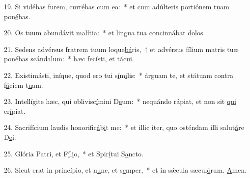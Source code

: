19. Si vidébas furem, curr\uline{é}bas cum \uline{e}o:~* et cum adúlteris portiónem t\uline{u}am pon\uline{é}bas.\par 
20. Os tuum abundávit mal\uline{í}t\uline{i}a:~* et lingua tua concinn\uline{á}bat d\uline{o}los.\par 
21. Sedens advérsus fratrem tuum loque\uline{bá}ris,~† et advérsus fílium matris tuæ ponébas sc\uline{á}nd\uline{a}lum:~* hæc fec\uline{í}sti, et t\uline{á}cui.\par 
22. Existimásti, iníque, quod ero tui s\uline{í}m\uline{i}lis:~* árguam te, et státuam contra f\uline{á}ciem t\uline{u}am.\par 
23. Intellígite hæc, qui oblivisc\uline{í}mini D\uline{e}um:~* nequándo rápiat, et non sit \uline{qui} er\uline{í}piat.\par 
24. Sacrifícium laudis honorific\uline{á}b\uline{i}t me:~* et illic iter, quo osténdam illi salut\uline{á}re D\uline{e}i.\par 
25. Glória Patri, et F\uline{í}l\uline{i}o,~* et Spir\uline{í}tui S\uline{a}ncto.\par 
26. Sicut erat in princípio, et n\uline{u}nc, et s\uline{e}mper,~* et in sǽcula sæcul\uline{ó}rum. \uline{A}men.\par 
